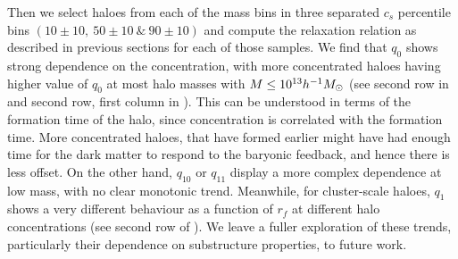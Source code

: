 Then we select haloes from each of the mass bins in three separated $c_s$ percentile bins $(10\pm10, ~50\pm10 ~\&~ 90\pm10)$  and compute the relaxation relation as described in previous sections for each of those samples. 
We find that $q_0$ shows strong dependence on the concentration, with more concentrated haloes having higher value of $q_0$ at most halo masses with $M \leq 10^{13} h^{-1}M_{\odot}$ (see second row in  and second row, first column in ). This can be understood in terms of the formation time of the halo, since concentration is correlated with the formation time. More concentrated haloes, that have formed earlier might have had enough time for the dark matter to respond to the baryonic feedback, and hence there is less offset. On the other hand, $q_{10}$ or $q_{11}$ display a more complex dependence at low mass, with no clear monotonic trend. Meanwhile, for cluster-scale haloes, $q_1$ shows a very different behaviour as a function of $r_f$ at different halo concentrations (see second row of ). We leave a fuller exploration of these trends, particularly their dependence on substructure properties, to future work.



